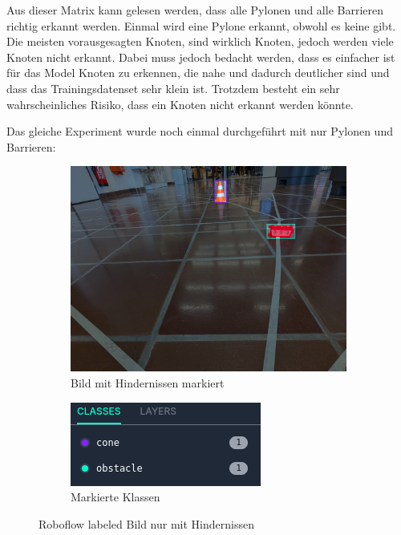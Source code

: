 Aus dieser Matrix kann gelesen werden, dass alle Pylonen und alle Barrieren richtig erkannt werden. Einmal wird eine Pylone erkannt, obwohl es keine gibt. Die meisten vorausgesagten Knoten, sind wirklich Knoten, jedoch werden viele Knoten nicht erkannt. Dabei muss jedoch bedacht werden, dass es einfacher ist für das Model Knoten zu erkennen, die nahe und dadurch deutlicher sind und dass das Trainingsdatenset sehr klein ist. Trotzdem besteht ein sehr wahrscheinliches Risiko, dass ein Knoten nicht erkannt werden könnte.

Das gleiche Experiment wurde noch einmal durchgeführt mit nur Pylonen und Barrieren:

\begin{figure}[H]
\begin{subfigure}{0.55\textwidth}
\includegraphics[width=0.95\linewidth]{assets/informatik-prototyp/yolo/label-cone-obstacle.png} 
\caption{Bild mit Hindernissen markiert}
\label{fig:labeled-image-obst}
\end{subfigure}
\begin{subfigure}{0.4\textwidth}
\includegraphics[width=0.95\linewidth]{assets/informatik-prototyp/yolo/classes-cone-obstacle.png} 
\caption{Markierte Klassen}
\label{fig:cone-obst-classes}
\end{subfigure}
\caption{Roboflow labeled Bild nur mit Hindernissen}
\label{fig:labeling-with-cone-obst}
\end{figure}


